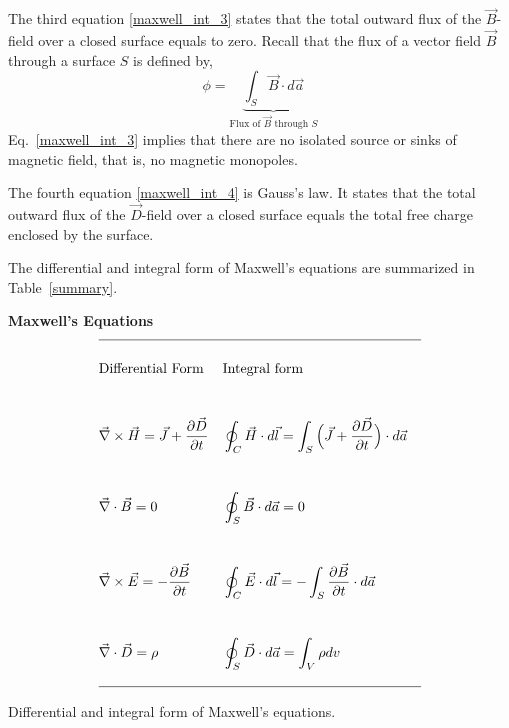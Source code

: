 \documentclass[11pt,a4paper,oneside]{book}
\numberwithin{equation}{section}
\theoremstyle{it}
\theoremstyle{definition}
\begin{document}
The third equation \ref{maxwell_int_3} states that the total outward flux of the $\vec{B}$-field over a closed surface equals to zero. Recall that the flux of a vector field $\vec{B}$ through a surface $S$ is defined by, 
\begin{equation*}\label{}
	\phi = \underbrace{\int_{S}\vec{B}\cdot d\vec{a}}_{\text{Flux of $\vec{B}$ through $S$}}
\end{equation*}
Eq.~\eqref{maxwell_int_3} implies that there are no isolated source or sinks of magnetic field, that is, no magnetic monopoles. 

The fourth equation \eqref{maxwell_int_4} is Gauss's law. It states that the total outward flux of the $\vec{D}$-field over a closed surface equals the total free charge enclosed by the surface. 

The differential and integral form of Maxwell's equations are summarized in Table~\ref{summary}.
\begin{table}
\centering \textbf{Maxwell's Equations} \\
	\begin{align*}
		\hline \\
		&\text{Differential Form} 	& 	&\text{Integral form} \\[24pt] 
		&\vec{\nabla}\times\vec{H}=\vec{J} + \frac{\partial \vec{D}}{\partial t}	& 	
		&\oint_C\vec{H}\cdot d\vec{l}=\int_S\Big(\vec{J} + \frac{\partial \vec{D}}{\partial t}\Big)\cdot 	d\vec{a}		\\[24pt]  
		&\vec{\nabla} \cdot\vec{B}=0	&
		&\oint_{S}\vec{B}\cdot d\vec{a}=0 \\[24pt] 
		&\vec{\nabla}\times\vec{E}=- \frac{\partial \vec{B}}{\partial t}	&	
		&\oint_{C}\vec{E}\cdot d\vec{l}=-\int_{S}\frac{\partial \vec{B}}{\partial t}\cdot d\vec{a} \\[24pt] 
		&\vec{\nabla}\cdot\vec{D}=\rho	&
		&\oint_{S}\vec{D}\cdot d\vec{a}=\int_{V}\rho dv	\\[12pt] 
		\hline
	\end{align*}
\caption{Differential and integral form of Maxwell's equations.}
\label{summary}
\end{table}
\end{document}
